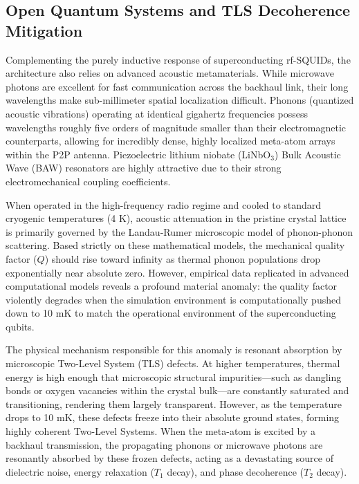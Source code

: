 \documentclass[11pt,a4paper]{article}
\begin{document}
\subsection{Open Quantum Systems and TLS Decoherence Mitigation}

Complementing the purely inductive response of superconducting rf-SQUIDs, the architecture also relies on advanced acoustic metamaterials. While microwave photons are excellent for fast communication across the backhaul link, their long wavelengths make sub-millimeter spatial localization difficult.\cite{ref6} Phonons (quantized acoustic vibrations) operating at identical gigahertz frequencies possess wavelengths roughly five orders of magnitude smaller than their electromagnetic counterparts, allowing for incredibly dense, highly localized meta-atom arrays within the P2P antenna.\cite{ref6} Piezoelectric lithium niobate (LiNbO$_3$) Bulk Acoustic Wave (BAW) resonators are highly attractive due to their strong electromechanical coupling coefficients.\cite{ref6}

When operated in the high-frequency radio regime and cooled to standard cryogenic temperatures (4 K), acoustic attenuation in the pristine crystal lattice is primarily governed by the Landau-Rumer microscopic model of phonon-phonon scattering.\cite{ref6} Based strictly on these mathematical models, the mechanical quality factor ($Q$) should rise toward infinity as thermal phonon populations drop exponentially near absolute zero.\cite{ref6} However, empirical data replicated in advanced computational models reveals a profound material anomaly: the quality factor violently degrades when the simulation environment is computationally pushed down to 10 mK to match the operational environment of the superconducting qubits.\cite{ref6}

The physical mechanism responsible for this anomaly is resonant absorption by microscopic Two-Level System (TLS) defects.\cite{ref6} At higher temperatures, thermal energy is high enough that microscopic structural impurities---such as dangling bonds or oxygen vacancies within the crystal bulk---are constantly saturated and transitioning, rendering them largely transparent.\cite{ref6} However, as the temperature drops to 10 mK, these defects freeze into their absolute ground states, forming highly coherent Two-Level Systems.\cite{ref6} When the meta-atom is excited by a backhaul transmission, the propagating phonons or microwave photons are resonantly absorbed by these frozen defects, acting as a devastating source of dielectric noise, energy relaxation ($T_1$ decay), and phase decoherence ($T_2$ decay).\cite{ref6}
\end{document}
